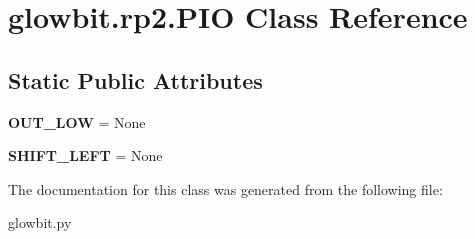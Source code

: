 \hypertarget{classglowbit_1_1rp2_1_1PIO}{}\section{glowbit.\+rp2.\+P\+IO Class Reference}
\label{classglowbit_1_1rp2_1_1PIO}
\subsection*{Static Public Attributes}
\begin{DoxyCompactItemize}
\item 
\mbox{\label{classglowbit_1_1rp2_1_1PIO_a5621c6b4c70eb35dc4beacf13451c826}} 
{\bfseries O\+U\+T\+\_\+\+L\+OW} = None
\item 
\mbox{\label{classglowbit_1_1rp2_1_1PIO_a945bdbedbb97c7d792c568df1ca2b2d6}} 
{\bfseries S\+H\+I\+F\+T\+\_\+\+L\+E\+FT} = None
\end{DoxyCompactItemize}


The documentation for this class was generated from the following file\+:\begin{DoxyCompactItemize}
\item 
glowbit.\+py\end{DoxyCompactItemize}
